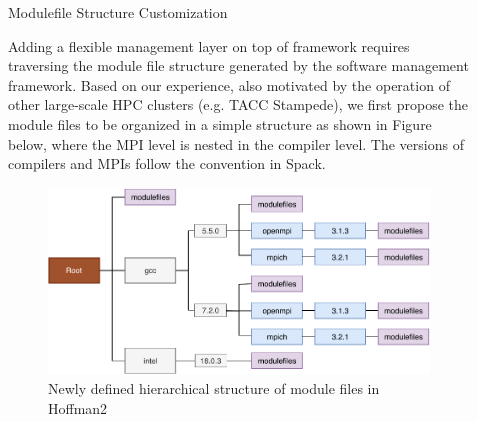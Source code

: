 \documentclass[final]{beamer}
\newlength{\sepwid}
\newlength{\onecolwid}
\begin{document}
\begin{frame}[t]
\begin{columns}[t]
\begin{column}{\onecolwid}
\end{column} %



\begin{column}{\sepwid}\end{column} %

\begin{column}{\onecolwid} %



\begin{block}{Modulefile Structure Customization}

Adding a flexible management layer on top of framework requires traversing the module file structure generated by the software management framework.
Based on our experience, also motivated by the operation of other large-scale HPC clusters (e.g. TACC Stampede), we first propose the module files to be organized in a simple structure as shown in Figure below, where the MPI level is nested in the compiler level. 
The versions of compilers and MPIs follow the convention in Spack. 

\vspace{0.75em}
\begin{figure}[htbp]
  \centerline{\includegraphics[width=0.9\linewidth]{figures/h2_new_hier}}
  \caption{Newly defined hierarchical structure of module files in Hoffman2}
  \label{fig:h2_new_hier}
\end{figure}


\end{block}




\end{column}
\end{columns}
\end{frame}
\end{document}
